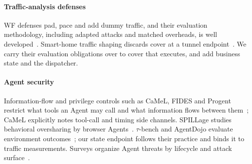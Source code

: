 \paragraph{Traffic-analysis defenses}
WF defenses pad, pace and add dummy traffic, and their evaluation methodology, including adapted attacks and matched overheads, is well developed~\cite{juarez2014critical,mathews2023critical,dyer2012peekaboo,wang2017walkietalkie,gong2020front,juarez2016wtfpad,shmatikov2006adaptive,cai2014tamaraw}. Smart-home traffic shaping discards cover at a tunnel endpoint~\cite{apthorpe2019stp}. We carry their evaluation obligations over to cover that executes, and add business state and the dispatcher.

\paragraph{Agent security}
Information-flow and privilege controls such as CaMeL, FIDES and Progent restrict what tools an Agent may call and what information flows between them~\cite{debenedetti2025camel,costa2025fides,shi2025progent}; CaMeL explicitly notes tool-call and timing side channels. SPILLage studies behavioral oversharing by browser Agents~\cite{roh2026spillage}. $\tau$-bench and AgentDojo evaluate environment outcomes~\cite{yao2024taubench,debenedetti2024agentdojo}; our state endpoint follows their practice and binds it to traffic measurements. Surveys organize Agent threats by lifecycle and attack surface~\cite{yao2024survey,shahriar2025survey,ferrag2025survey}.
